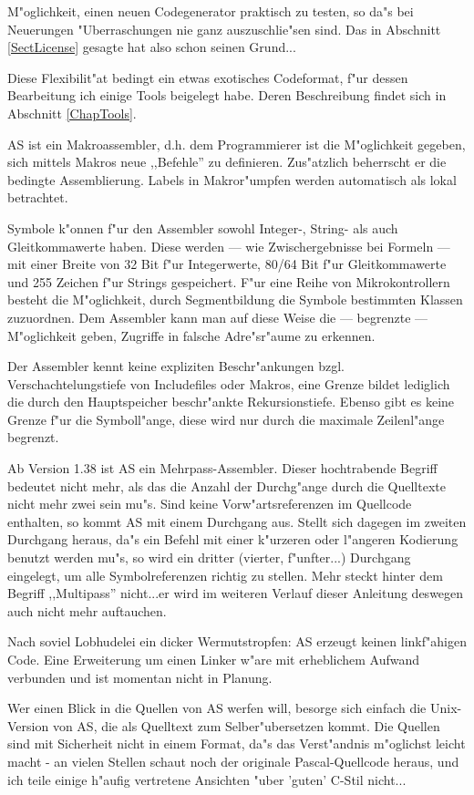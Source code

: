 \documentclass[12pt,a4paper,twoside]{report}
\begin{document}
M"oglichkeit, einen neuen Codegenerator praktisch zu testen, so da"s bei
Neuerungen "Uberraschungen nie ganz auszuschlie"sen sind.  Das in
Abschnitt \ref{SectLicense} gesagte hat also schon seinen Grund...
\par
Diese Flexibilit"at bedingt ein etwas exotisches Codeformat, f"ur dessen
Bearbeitung ich einige Tools beigelegt habe.  Deren Beschreibung findet
sich in Abschnitt \ref{ChapTools}.
\par
AS ist ein Makroassembler, d.h. dem Programmierer ist die M"oglichkeit
gegeben, sich mittels Makros neue ,,Befehle'' zu definieren.  Zus"atzlich
beherrscht er die bedingte Assemblierung.  Labels in Makror"umpfen werden
automatisch als lokal betrachtet.
\par
Symbole k"onnen f"ur den Assembler sowohl Integer-, String- als auch
Gleitkommawerte haben.  Diese werden --- wie Zwischergebnisse bei Formeln
--- mit einer Breite von 32 Bit f"ur Integerwerte, 80/64 Bit f"ur
Gleitkommawerte und 255 Zeichen f"ur Strings gespeichert.  F"ur eine Reihe
von Mikrokontrollern besteht die M"oglichkeit, durch Segmentbildung die
Symbole bestimmten Klassen zuzuordnen.  Dem Assembler kann man auf diese
Weise die --- begrenzte --- M"oglichkeit geben, Zugriffe in falsche
Adre"sr"aume zu erkennen.
\par
Der Assembler kennt keine expliziten Beschr"ankungen bzgl.
Verschachtelungstiefe von Includefiles oder Makros, eine Grenze bildet
lediglich die durch den Hauptspeicher beschr"ankte Rekursionstiefe.
Ebenso gibt es keine Grenze f"ur die Symboll"ange, diese wird nur durch
die maximale Zeilenl"ange begrenzt.
\par
Ab Version 1.38 ist AS ein Mehrpass-Assembler.  Dieser hochtrabende Begriff
bedeutet nicht mehr, als das die Anzahl der Durchg"ange durch die Quelltexte
nicht mehr zwei sein mu"s.  Sind keine Vorw"artsreferenzen im Quellcode
enthalten, so kommt AS mit einem Durchgang aus.  Stellt sich dagegen im zweiten
Durchgang heraus, da"s ein Befehl mit einer k"urzeren oder l"angeren Kodierung
benutzt werden mu"s, so wird ein dritter (vierter, f"unfter...) Durchgang
eingelegt, um alle Symbolreferenzen richtig zu stellen.  Mehr steckt hinter dem
Begriff ,,Multipass'' nicht...er wird im weiteren Verlauf dieser Anleitung
deswegen auch nicht mehr auftauchen.
\par
Nach soviel Lobhudelei ein dicker Wermutstropfen: AS erzeugt keinen
linkf"ahigen Code.  Eine Erweiterung um einen Linker w"are mit erheblichem
Aufwand verbunden und ist momentan nicht in Planung.
\par
Wer einen Blick in die Quellen von AS werfen will, besorge sich einfach
die Unix-Version von AS, die als Quelltext zum Selber"ubersetzen kommt.
Die Quellen sind mit Sicherheit nicht in einem Format, da"s das
Verst"andnis m"oglichst leicht macht - an vielen Stellen schaut noch
der originale Pascal-Quellcode heraus, und ich teile einige h"aufig
vertretene Ansichten "uber 'guten' C-Stil nicht...
\end{document}
